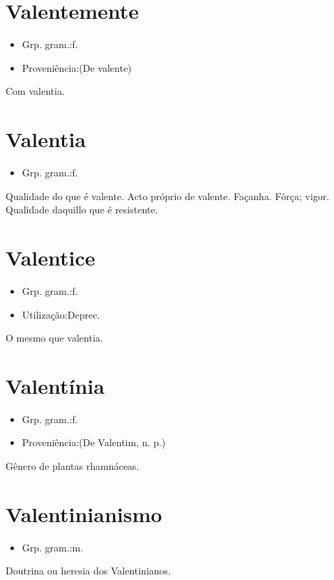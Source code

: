\documentclass{article}
\begin{document}
\section{Valentemente}
\begin{itemize}
\item {Grp. gram.:f.}
\end{itemize}
\begin{itemize}
\item {Proveniência:(De \textunderscore valente\textunderscore )}
\end{itemize}
Com valentia.
\section{Valentia}
\begin{itemize}
\item {Grp. gram.:f.}
\end{itemize}
Qualidade do que é valente.
Acto próprio de valente.
Façanha.
Fôrça; vigor.
Qualidade daquillo que é resistente.
\section{Valentice}
\begin{itemize}
\item {Grp. gram.:f.}
\end{itemize}
\begin{itemize}
\item {Utilização:Deprec.}
\end{itemize}
O mesmo que \textunderscore valentia\textunderscore .
\section{Valentínia}
\begin{itemize}
\item {Grp. gram.:f.}
\end{itemize}
\begin{itemize}
\item {Proveniência:(De \textunderscore Valentim\textunderscore , n. p.)}
\end{itemize}
Gênero de plantas rhamnáceas.
\section{Valentinianismo}
\begin{itemize}
\item {Grp. gram.:m.}
\end{itemize}
Doutrina ou heresia dos Valentinianos.
\end{document}
